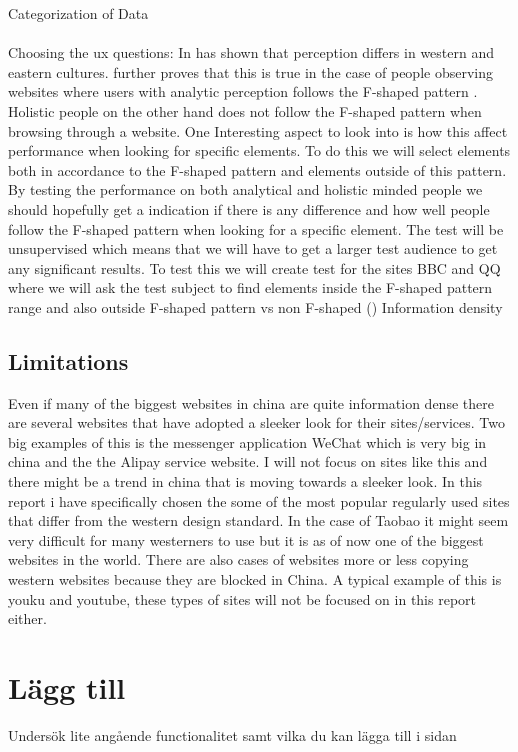   Categorization of Data
  \\\\
  Choosing the ux questions:
  In \cite{Holistic_vs_Analytic} has shown that perception differs in western and eastern cultures. \cite{cross_web} further proves that this is true in the case of people observing websites where users with analytic perception follows the F-shaped pattern \cite{pernice2014people}. Holistic people on the other hand does not follow the F-shaped pattern when browsing through a website. \cite{cross_web} One Interesting aspect to look into is how this affect performance when looking for specific elements. To do this we will select elements both in accordance to the F-shaped pattern and elements outside of this pattern. By testing the performance on both analytical and holistic minded people we should hopefully get a indication if there is any difference and how well people follow the F-shaped pattern when looking for a specific element. The test will be unsupervised which means that we will have to get a larger test audience to get any significant results. To test this we will create test for the sites BBC and QQ where we will ask the test subject to find elements inside the F-shaped pattern range and also outside
  F-shaped pattern vs non F-shaped (\cite{cross_web})
  Information density
   
 \subsection{Limitations}
 Even if many of the biggest websites in china are quite information dense there are several websites that have adopted a sleeker look for their sites/services. Two big examples of this is the messenger application WeChat which is very big in china and the the Alipay service website. I will not focus on sites like this and there might be a trend in china that is moving towards a sleeker look. In this report i have specifically chosen the some of the most popular regularly used sites that differ from the western design standard. In the case of Taobao it might seem very difficult for many westerners to use but it is as of now one of the biggest websites in the world. There are also cases of websites more or less copying western websites because they are blocked in China. A typical example of this is youku and youtube, these types of sites will not be focused on in this report either.
 
 \section{Lägg till}
 Undersök lite angående functionalitet samt vilka du kan lägga till i sidan